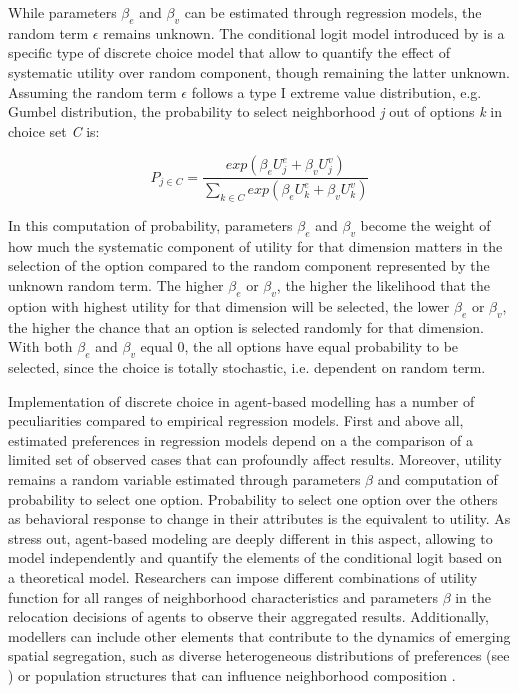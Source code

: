 \documentclass{article}
\begin{document}
While parameters $\beta_e$ and $\beta_v$ can be estimated  through regression models, the random term $\epsilon$ remains unknown. The conditional logit model introduced by  \textcite{mcfadden1973conditional} is a specific type of discrete choice model that allow to quantify the effect of systematic utility over random component, though remaining the latter unknown. Assuming the random term $\epsilon$ follows a type I extreme value distribution, e.g. Gumbel distribution, the probability to select neighborhood \textit{j} out of options \textit{k} in choice set \textit{C} is:

\begin{equation}
P_{j\in{C}} = \frac{exp(\beta_e U^e_j + \beta_v U^v_j)}{\sum\limits_{{k\in{C}}}exp(\beta_e U^e_k + \beta_v U^v_k)}
\label{eq:cndtnl}
\end{equation}

In this computation of probability, parameters $\beta_e$ and $\beta_v$ become the weight of how much the systematic component of utility for that dimension matters in the selection of the option compared to the random component represented  by the unknown random term. The higher $\beta_e$ or $\beta_v$, the higher the likelihood that the option with highest utility for that dimension will be selected, the lower $\beta_e$ or $\beta_v$, the higher the chance that an option is selected randomly for that dimension. With both $\beta_e$ and $\beta_v$ equal 0, the all options have equal probability to be selected, since the choice is totally stochastic, i.e. dependent on random term.


Implementation of discrete choice in agent-based modelling has a  number of peculiarities compared to empirical regression models. First and above all, estimated preferences in regression models depend on a the comparison of a limited set of observed cases that can profoundly affect results. Moreover, utility remains a random variable estimated through parameters $\beta$ and computation of probability to select one option. Probability to select one option over the others as behavioral response to change in their attributes is the equivalent to utility. As \autocite{bruch2009preferences} stress out, agent-based modeling are deeply different in this aspect, allowing to model independently and quantify the elements of the conditional logit based on a theoretical model. Researchers can impose different combinations of utility function for all ranges of neighborhood characteristics and parameters $\beta$ in the relocation decisions of agents to observe their aggregated results. Additionally, modellers can include other elements that contribute to the dynamics of emerging spatial segregation, such as diverse heterogeneous distributions of preferences (see \autocite{xie2012modeling}) or population structures that can influence neighborhood composition \autocite{bruch2014population}.
\end{document}
